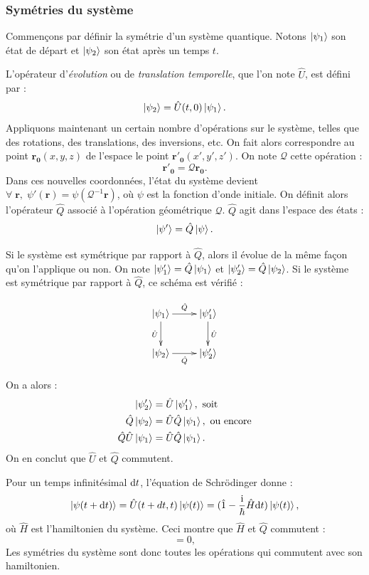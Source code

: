 \subsubsection{Symétries du système}
Commençons par définir la symétrie d'un système quantique. Notons $\ket{\psi_1}$ son état de départ et $\ket{\psi_2}$ son état après un temps $t$. \par
L'opérateur d'\textit{évolution} ou de \textit{translation temporelle}, que l'on note $\hat{U}$, est défini par :
\begin{equation}
\ket{\psi_2}=\hat{U}(t,0)\ket{\psi_1}.
\end{equation}
Appliquons maintenant un certain nombre d'opérations sur le système, telles que des rotations, des translations, des inversions, etc. On fait alors correspondre au point $\bm{r_0}(x,y,z)$ de l'espace le point $\bm{r'_0}(x',y',z')$. On note $\mathcal{Q}$ cette opération :
\[  \bm{r'_0} = \mathcal{Q} \bm{r_0}.\]
Dans ces nouvelles coordonnées, l'état du système devient $\forall\;\bm{r},\;\psi'(\bm{r}) = \psi(\mathcal{Q}^{-1}\bm{r})$, où $\psi$ est la fonction d'onde initiale. On définit alors l'opérateur $\hat{Q}$ associé à l'opération géométrique $\mathcal{Q}$. $\hat{Q}$ agit dans l'espace des états : 
\[\ket{\psi'} = \hat{Q}\ket{\psi}.\]

Si le système est symétrique par rapport à $\hat{Q}$, alors il évolue de la même façon qu'on l'applique ou non. On note $\ket{\psi'_1}=\hat{Q}\ket{\psi_1}$ et $\ket{\psi'_2}=\hat{Q}\ket{\psi_2}$. Si le système est symétrique par rapport à $\hat{Q}$, ce schéma est vérifié :

\begin{displaymath}
    \xymatrix{
        \ket{\psi_1} \ar[r]^{\hat{Q}} \ar[d]_{\hat{U}} & \ket{\psi'_1} \ar[d]^{\hat{U}} \\
        \ket{\psi_2} \ar[r]_{\hat{Q}}       & \ket{\psi'_2} }
\end{displaymath}

On a alors :
\begin{align}
\ket{\psi'_2}&=\hat{U}\ket{\psi'_1}, \mbox{ soit}\\
\hat{Q}\ket{\psi_2}&=\hat{U}\hat{Q}\ket{\psi_1}, \mbox{ ou encore}\\
\hat{Q}\hat{U}\ket{\psi_1}&=\hat{U}\hat{Q}\ket{\psi_1}.
\end{align}
On en conclut que $\hat{U}$ et $\hat{Q}$ commutent.

Pour un temps infinitésimal $\mathrm{d} t$, l'équation de Schrödinger donne :
\[\ket{\psi(t+\mathrm{d} t)} = \hat{U}(t+dt,t)\ket{\psi(t)} = (\hat{1}-\frac{\mathrm{i}}{\hbar} \hat{H}\mathrm{d} t)\ket{\psi(t)},\]
où $\hat{H}$ est l'hamiltonien du système. Ceci montre que $\hat{H}$ et $\hat{Q}$ commutent :
\begin{equation}
[\hat{H},\hat{Q}]=0,
\end{equation}
Les symétries du système sont donc toutes les opérations qui commutent avec son hamiltonien.

